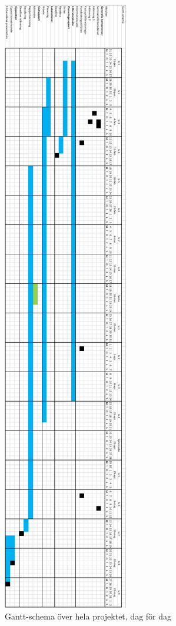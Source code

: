 \documentclass{article}
\begin{document}
\newpage
\thispagestyle{empty}
\begin{figure}[H]
    \centering
    \includegraphics[scale=0.6]{Ganttroterad.PNG}
    \caption{Gantt-schema över hela projektet, dag för dag}
    \label{fig:Ganttroterad}
\end{figure}
\end{document}
